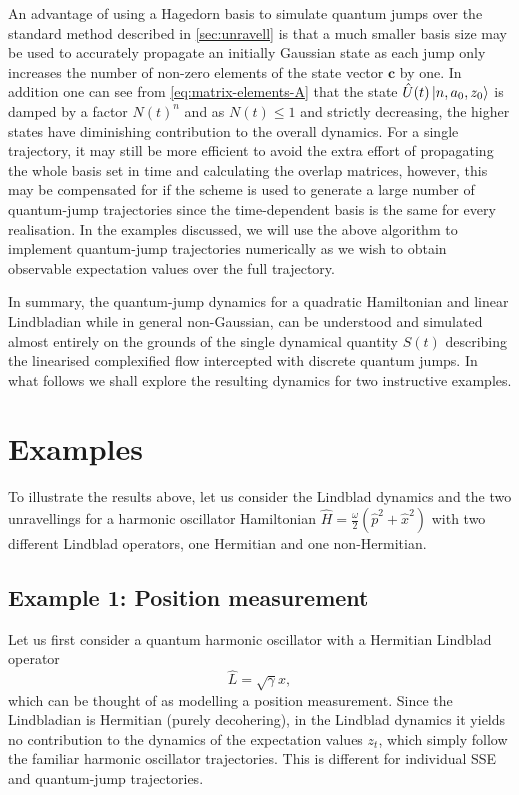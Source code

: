 \documentclass[12pt]{iopart} %
\begin{document}
An advantage of using a Hagedorn basis to simulate quantum jumps over the standard method described in \cref{sec:unravell} is that a much smaller basis size may be used to accurately propagate an initially Gaussian state as each jump only increases the number of non-zero elements of the state vector $\mathbf{c}$ by one. In addition one can see from \cref{eq:matrix-elements-A} that the state $\hat{U}(t)\ket{n,a_0,z_0}$ is damped by a factor $N(t)^n$ and as $N(t)\leq1$ and strictly decreasing, the higher states have diminishing contribution to the overall dynamics. For a single trajectory, it may still be more efficient to avoid the extra effort of propagating the whole basis set in time and calculating the overlap matrices, however, this may be compensated for if the scheme is used to generate a large number of quantum-jump trajectories since the time-dependent basis is the same for every realisation. In the examples discussed, we will use the above algorithm to implement quantum-jump trajectories numerically as we wish to obtain observable expectation values over the full trajectory.

 In summary, the quantum-jump dynamics for a quadratic Hamiltonian and linear Lindbladian while in general non-Gaussian, can be understood and simulated almost entirely on the grounds of the single dynamical quantity $S(t)$ describing the linearised complexified flow intercepted with discrete quantum jumps. 
In what follows we shall explore the resulting dynamics for two instructive examples.

\section{Examples} \label{sec:examples}
To illustrate the results above, let us consider the Lindblad dynamics and the two unravellings for a harmonic oscillator Hamiltonian $\hat H = \frac{\omega}{2} \left(\hat p^2 +\hat x^2\right)$ with two different Lindblad operators, one Hermitian and one non-Hermitian. 
\FloatBarrier
\subsection{Example 1: Position measurement} 
Let us first consider a quantum harmonic oscillator with a Hermitian Lindblad operator
\begin{equation} \label{eq:PosModel}
   \hat L=\sqrt{\gamma} \hat x,
\end{equation}
which can be thought of as modelling a position measurement. Since the Lindbladian is Hermitian (purely decohering), in the Lindblad dynamics it yields no contribution to the dynamics of the expectation values $z_t$, which simply follow the familiar harmonic oscillator trajectories. This is different for individual SSE and quantum-jump trajectories.
\end{document}
